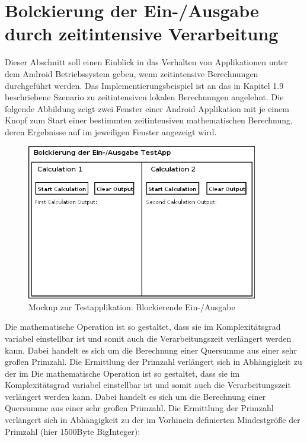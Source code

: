 \documentclass[12pt,oneside,a4paper,bibtotoc,liststotoc]{scrreprt}
\begin{document}
\section{Bolckierung der Ein-/Ausgabe durch zeitintensive Verarbeitung}
Dieser Abschnitt soll einen Einblick in das Verhalten von Applikationen unter dem Android Betriebssystem geben, wenn zeitintensive Berechnungen durchgeführt werden. Das Implementierungsbeispiel ist an das in Kapitel 1.9 beschriebene Szenario zu zeitintensiven lokalen Berechnungen angelehnt.
Die folgende Abbildung zeigt zwei Fenster einer Android Applikation mit je einem Knopf zum Start einer bestimmten zeitintensiven mathematischen Berechnung, deren Ergebnisse auf im jeweiligen Fenster angezeigt wird.
\begin{figure}[H]
  \begin{centering}
    \includegraphics[width=0.9\textwidth]{img/BlockingIO_testApp_Mockup.png}
    \caption{Mockup zur Testapplikation: Blockierende Ein-/Ausgabe}
    \label{BlockingIO_testApp_Mockup}
  \end{centering}
\end{figure}
Die mathematische Operation ist so gestaltet, dass sie im Komplexitätsgrad variabel einstellbar ist und somit auch die Verarbeitungszeit verlängert werden kann. Dabei handelt es sich um die Berechnung einer Quersumme aus einer sehr großen Primzahl. Die Ermittlung der Primzahl verlängert sich in Abhängigkeit zu der im Die mathematische Operation ist so gestaltet, dass sie im Komplexitätsgrad variabel einstellbar ist und somit auch die Verarbeitungszeit verlängert werden kann. Dabei handelt es sich um die Berechnung einer Quersumme aus einer sehr großen Primzahl. Die Ermittlung der Primzahl verlängert sich in Abhängigkeit zu der im Vorhinein definierten Mindestgröße der Primzahl (hier 1500Byte BigInteger):\newline
\end{document}
